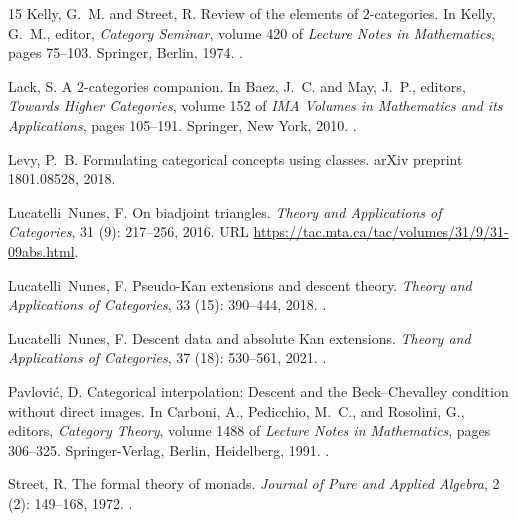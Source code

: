 \documentclass[11pt,a4paper]{article}
\numberwithin{equation}{section}
\theoremstyle{definition}
\theoremstyle{remark}
\begin{document}
\begin{thebibliography}{15}
Kelly, G.~M. and Street, R.
\newblock Review of the elements of {$2$}-categories.
\newblock In Kelly, G.~M., editor, \emph{Category Seminar}, volume 420 of
  \emph{Lecture Notes in Mathematics}, pages 75--103. Springer, Berlin, 1974.
\newblock {}.

Lack, S.
\newblock A {$2$}-categories companion.
\newblock In Baez, J.~C. and May, J.~P., editors, \emph{Towards Higher
  Categories}, volume 152 of \emph{IMA Volumes in Mathematics and its
  Applications}, pages 105--191. Springer, New York, 2010.
\newblock {}.

Levy, P.~B.
\newblock Formulating categorical concepts using classes.
\newblock arXiv preprint 1801.08528, 2018.

Lucatelli~Nunes, F.
\newblock On biadjoint triangles.
\newblock \emph{Theory and Applications of Categories}, 31
  (9): 217--256, 2016.
\newblock URL \url{https://tac.mta.ca/tac/volumes/31/9/31-09abs.html}.

Lucatelli~Nunes, F.
\newblock Pseudo-{Kan} extensions and descent theory.
\newblock \emph{Theory and Applications of Categories}, 33
  (15): 390--444, 2018.
\newblock {}.

Lucatelli~Nunes, F.
\newblock Descent data and absolute {Kan} extensions.
\newblock \emph{Theory and Applications of Categories}, 37
  (18): 530--561, 2021.
\newblock {}.

Pavlovi{\'c}, D.
\newblock Categorical interpolation: {Descent} and the {Beck--Chevalley}
  condition without direct images.
\newblock In Carboni, A., Pedicchio, M.~C., and Rosolini, G., editors,
  \emph{Category Theory}, volume 1488 of \emph{Lecture Notes in Mathematics},
  pages 306--325. Springer-Verlag, Berlin, Heidelberg, 1991.
\newblock {}.

Street, R.
\newblock The formal theory of monads.
\newblock \emph{Journal of Pure and Applied Algebra}, 2 (2):
  149--168, 1972.
\newblock {}.

\end{thebibliography}
\end{document}
